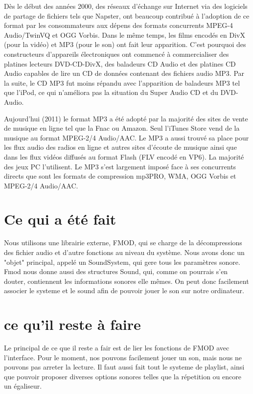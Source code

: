 \documentclass[12pt]{report}
\begin{document}
Dès le début des années 2000, des réseaux d'échange sur Internet via des logiciels de partage de fichiers tels que Napster, ont beaucoup contribué à l'adoption de ce format par les consommateurs aux dépens des formats concurrents MPEG-4 Audio/TwinVQ et OGG Vorbis. Dans le même temps, les films encodés en DivX (pour la vidéo) et MP3 (pour le son) ont fait leur apparition. C'est pourquoi des constructeurs d'appareils électroniques ont commencé à commercialiser des platines lecteurs DVD-CD-DivX, des baladeurs CD Audio et des platines CD Audio capables de lire un CD de données contenant des fichiers audio MP3. Par la suite, le CD MP3 fut moins répandu avec l'apparition de baladeurs MP3 tel que l'iPod, ce qui n'améliora pas la situation du Super Audio CD et du DVD-Audio.

Aujourd'hui (2011) le format MP3 a été adopté par la majorité des sites de vente de musique en ligne tel que la Fnac ou Amazon. Seul l'iTunes Store vend de la musique au format MPEG-2/4 Audio/AAC. Le MP3 a aussi trouvé sa place pour les flux audio des radios en ligne et autres sites d'écoute de musique ainsi que dans les flux vidéos diffusés au format Flash (FLV encodé en VP6). La majorité des jeux PC l'utilisent. Le MP3 s'est largement imposé face à ses concurrents directs que sont les formats de compression mp3PRO, WMA, OGG Vorbis et MPEG-2/4 Audio/AAC.

\section{Ce qui a été fait}
Nous utilisons une librairie externe, FMOD, qui se charge de la décompressions des fichier audio et d'autre fonctions au niveau du système. Nous avons donc un "objet" principal, appelé un SoundSystem, qui gere tous les paramètres sonore. Fmod nous donne aussi des structures Sound, qui, comme on pourrais s'en douter, contiennent les informations sonores elle mêmes. On peut donc facilement associer le systeme et le sound afin de pouvoir jouer le son sur notre ordinateur.

\section{ce qu'il reste à faire}
Le principal de ce que il reste a fair est de lier les fonctions de FMOD avec l'interface. Pour le moment, nos pouvons facilement jouer un son, mais nous ne pouvons pas arreter la lecture. Il faut aussi fait tout le systeme de playlist, ainsi que pouvoir proposer diverses options sonores telles que la répetition ou encore un égaliseur.
\end{document}
